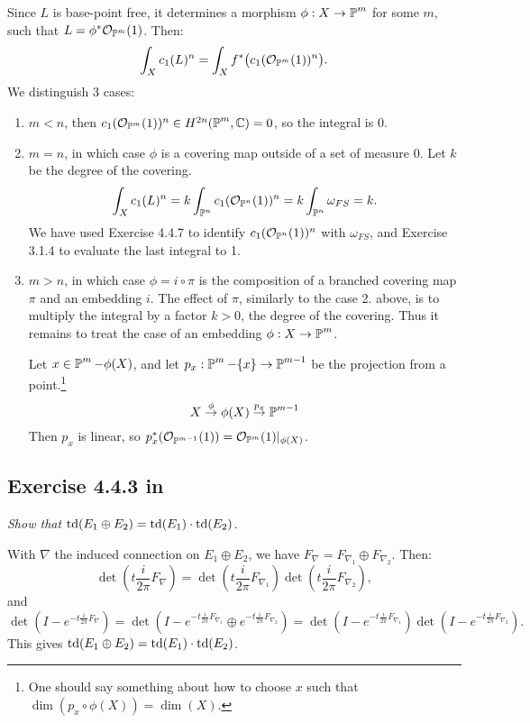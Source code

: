 \documentclass{article}
\begin{document}
Since $L$ is base-point free, it determines a morphism $\phi : X \to \operatorname{\mathbb{P}}^m$ for some $m$, such that $L = \phi^*
\mathcal{O}_{\operatorname{\mathbb{P}}^m}(1)$. Then:
\[	\int_X c_1(L)^n = \int_X f^*\big(c_1(\mathcal{O}_{\operatorname{\mathbb{P}}^m}(1))^n \big).	\]
We distinguish 3 cases:
\begin{enumerate}
\item $m<n$, then $c_1(\mathcal{O}_{\operatorname{\mathbb{P}}^m}(1))^n \in H^{2n}(\operatorname{\mathbb{P}}^m, \mathbb{C}) = 0$, so the integral is 0.
\item $m=n$, in which case $\phi$ is a covering map outside of a set of measure 0. Let $k$ be the degree of the covering.
\[	\int_X c_1(L)^n = k \int_{\operatorname{\mathbb{P}}^n} c_1(\mathcal{O}_{\operatorname{\mathbb{P}}^n}(1))^n = k \int_{\operatorname{\mathbb{P}}^n} \omega_{FS} = k.	\]
We have used Exercise 4.4.7 to identify $c_1(\mathcal{O}_{\operatorname{\mathbb{P}}^n}(1))^n$ with $\omega_{FS}$, and Exercise 3.1.4 to
evaluate the last integral to 1.
\item $m>n$, in which case $\phi = i \circ \pi$ is the composition of a branched covering map $\pi$ and an embedding $i$. The
effect of $\pi$, similarly to the case 2. above, is to multiply the integral by a factor $k>0$, the degree of the covering.
Thus it remains to treat the case of an embedding $\phi : X \to \operatorname{\mathbb{P}}^m$.

Let $x \in \operatorname{\mathbb{P}}^m - \phi(X)$, and let $p_x : \operatorname{\mathbb{P}}^m - \{x\} \to \operatorname{\mathbb{P}}^{m-1}$ be the projection from a point.\footnote{One should
say something about how to choose $x$ such that $\dim(p_x \circ \phi(X)) = \dim(X)$.}
\[	X \overset{\phi}{\to} \phi(X) \overset{p_x}{\to} \operatorname{\mathbb{P}}^{m-1}	\]
Then $p_x$ is linear, so $p_x^*(\mathcal{O}_{\operatorname{\mathbb{P}}^{m-1}}(1)) = \mathcal{O}_{\operatorname{\mathbb{P}}^m}(1)|_{\phi(X)}$.  
\end{enumerate}




\subsection*{Exercise 4.4.3 in \cite{Huy}}
\emph{Show that $\operatorname{td}(E_1 \oplus E_2) = \operatorname{td}(E_1) \cdot \operatorname{td}(E_2)$.}
\vspace{3mm}

With $\nabla$ the induced connection on $E_1 \oplus E_2$, we have $F_{\nabla} = F_{\nabla_1} \oplus F_{\nabla_2}$.
Then:
\[	\det\left( t \frac{i}{2\pi} F_{\nabla} \right) = \det\left( t \frac{i}{2\pi} F_{\nabla_1} \right)
\det\left( t \frac{i}{2\pi} F_{\nabla_2} \right),	\]
and
\[	\det\left(I - e^{-t \frac{i}{2\pi}F_{\nabla}}\right) = \det\left(I - e^{-t \frac{i}{2\pi}F_{\nabla_1}}\oplus
e^{-t \frac{i}{2\pi}F_{\nabla_2}}\right) = \det\left(I - e^{-t \frac{i}{2\pi}F_{\nabla_1}}\right)
\det\left(I - e^{-t \frac{i}{2\pi}F_{\nabla_2}}\right).	\]
This gives $\operatorname{td}(E_1 \oplus E_2) = \operatorname{td}(E_1) \cdot \operatorname{td}(E_2)$.
\end{document}
